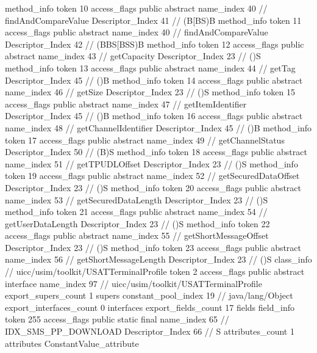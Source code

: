 {{{{{				}
				method_info {
					token	10
					access_flags	public abstract
					name_index	40		// findAndCompareValue
					Descriptor_Index	41		// (B[BS)B
				}
				method_info {
					token	11
					access_flags	public abstract
					name_index	40		// findAndCompareValue
					Descriptor_Index	42		// (BBS[BSS)B
				}
				method_info {
					token	12
					access_flags	public abstract
					name_index	43		// getCapacity
					Descriptor_Index	23		// ()S
				}
				method_info {
					token	13
					access_flags	public abstract
					name_index	44		// getTag
					Descriptor_Index	45		// ()B
				}
				method_info {
					token	14
					access_flags	public abstract
					name_index	46		// getSize
					Descriptor_Index	23		// ()S
				}
				method_info {
					token	15
					access_flags	public abstract
					name_index	47		// getItemIdentifier
					Descriptor_Index	45		// ()B
				}
				method_info {
					token	16
					access_flags	public abstract
					name_index	48		// getChannelIdentifier
					Descriptor_Index	45		// ()B
				}
				method_info {
					token	17
					access_flags	public abstract
					name_index	49		// getChannelStatus
					Descriptor_Index	50		// (B)S
				}
				method_info {
					token	18
					access_flags	public abstract
					name_index	51		// getTPUDLOffset
					Descriptor_Index	23		// ()S
				}
				method_info {
					token	19
					access_flags	public abstract
					name_index	52		// getSecuredDataOffset
					Descriptor_Index	23		// ()S
				}
				method_info {
					token	20
					access_flags	public abstract
					name_index	53		// getSecuredDataLength
					Descriptor_Index	23		// ()S
				}
				method_info {
					token	21
					access_flags	public abstract
					name_index	54		// getUserDataLength
					Descriptor_Index	23		// ()S
				}
				method_info {
					token	22
					access_flags	public abstract
					name_index	55		// getShortMessageOffset
					Descriptor_Index	23		// ()S
				}
				method_info {
					token	23
					access_flags	public abstract
					name_index	56		// getShortMessageLength
					Descriptor_Index	23		// ()S
				}
			}
		}
		class_info {		// uicc/usim/toolkit/USATTerminalProfile
			token	2
			access_flags	public abstract interface
			name_index	97		// uicc/usim/toolkit/USATTerminalProfile
			export_supers_count	1
			supers {
				constant_pool_index	19		// java/lang/Object
			}
			export_interfaces_count	0
			interfaces {
			}
			export_fields_count	17
			fields {
			field_info {
				token	255
				access_flags	public static final
				name_index	65		// IDX_SMS_PP_DOWNLOAD
				Descriptor_Index	66		// S
				attributes_count	1
				attributes {
				ConstantValue_attribute {
}}}}}}}
